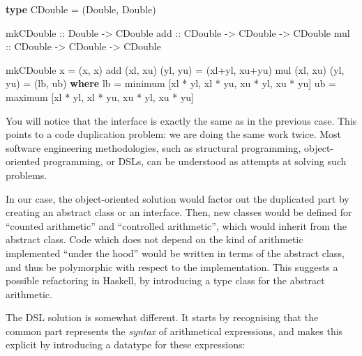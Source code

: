 \documentclass[]{article}
\newenvironment{Shaded}{}{}
\newcommand{\KeywordTok}[1]{\textcolor[rgb]{0.00,0.44,0.13}{\textbf{{#1}}}}
\newcommand{\DataTypeTok}[1]{\textcolor[rgb]{0.56,0.13,0.00}{{#1}}}
\newcommand{\OtherTok}[1]{\textcolor[rgb]{0.00,0.44,0.13}{{#1}}}
\newcommand{\FunctionTok}[1]{\textcolor[rgb]{0.02,0.16,0.49}{{#1}}}
\newcommand{\NormalTok}[1]{{#1}}
\begin{document}
\begin{Shaded}
\begin{Highlighting}[]
\KeywordTok{type} \DataTypeTok{CDouble} \FunctionTok{=} \NormalTok{(}\DataTypeTok{Double}\NormalTok{, }\DataTypeTok{Double}\NormalTok{)}

mkCDouble  \OtherTok{::}  \DataTypeTok{Double}   \OtherTok{->}  \DataTypeTok{CDouble}
add        \OtherTok{::}  \DataTypeTok{CDouble}  \OtherTok{->}  \DataTypeTok{CDouble}  \OtherTok{->}  \DataTypeTok{CDouble}
mul        \OtherTok{::}  \DataTypeTok{CDouble}  \OtherTok{->}  \DataTypeTok{CDouble}  \OtherTok{->}  \DataTypeTok{CDouble}

\NormalTok{mkCDouble x            }\FunctionTok{=}  \NormalTok{(x, x)}
\NormalTok{add (xl, xu) (yl, yu)  }\FunctionTok{=}  \NormalTok{(xl}\FunctionTok{+}\NormalTok{yl, xu}\FunctionTok{+}\NormalTok{yu)}
\NormalTok{mul (xl, xu) (yl, yu)  }\FunctionTok{=}  \NormalTok{(lb, ub)}
  \KeywordTok{where}
  \NormalTok{lb  }\FunctionTok{=}  \NormalTok{minimum [xl }\FunctionTok{*} \NormalTok{yl, xl }\FunctionTok{*} \NormalTok{yu, xu }\FunctionTok{*} \NormalTok{yl, xu }\FunctionTok{*} \NormalTok{yu]}
  \NormalTok{ub  }\FunctionTok{=}  \NormalTok{maximum [xl }\FunctionTok{*} \NormalTok{yl, xl }\FunctionTok{*} \NormalTok{yu, xu }\FunctionTok{*} \NormalTok{yl, xu }\FunctionTok{*} \NormalTok{yu]}
\end{Highlighting}
\end{Shaded}

You will notice that the interface is exactly the same as in the
previous case. This points to a code duplication problem: we are doing
the same work twice. Most software engineering methodologies, such as
structural programming, object-oriented programming, or DSLs, can be
understood as attempts at solving such problems.

In our case, the object-oriented solution would factor out the
duplicated part by creating an abstract class or an interface. Then, new
classes would be defined for ``counted arithmetic'' and ``controlled
arithmetic'', which would inherit from the abstract class. Code which
does not depend on the kind of arithmetic implemented ``under the hood''
would be written in terms of the abstract class, and thus be polymorphic
with respect to the implementation. This suggests a possible refactoring
in Haskell, by introducing a type class for the abstract arithmetic.

The DSL solution is somewhat different. It starts by recognising that
the common part represents the \emph{syntax} of arithmetical
expressions, and makes this explicit by introducing a datatype for these
expressions:
\end{document}
